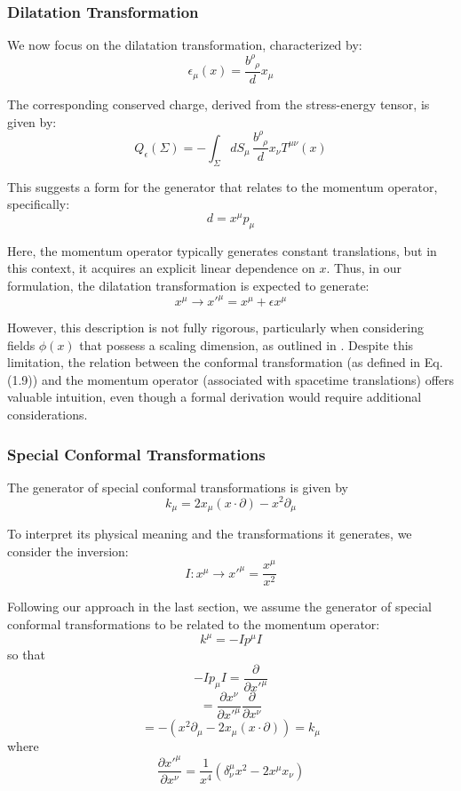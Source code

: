 \documentclass[12pt]{article}
\numberwithin{equation}{section}
\newcommand\<\langle
\renewcommand\>\rangle
\renewcommand\.{\cdot}
\begin{document}
\subsubsection*{Dilatation Transformation}
We now focus on the dilatation transformation, characterized by:
\[
    \epsilon_{\mu}(x) = \frac{b^{\rho}_{\,\,\,\rho}}{d}x_{\mu}
\]

The corresponding conserved charge, derived from the stress-energy tensor, is given by:
\[
    Q_{\epsilon}(\Sigma) = -\int_{\Sigma} dS_{\mu}\, \frac{b^{\rho}_{\,\,\,\rho}}{d}x_{\nu}T^{\mu\nu}(x)
\]

This suggests a form for the generator that relates to the momentum operator, specifically:
\[
    d = x^{\mu}p_{\mu}
\]

Here, the momentum operator typically generates constant translations, but in this context, it acquires an explicit linear dependence on \( x \). Thus, in our formulation, the dilatation transformation is expected to generate:
\[
    x^{\mu} \rightarrow x'^{\mu} = x^{\mu} + \epsilon x^{\mu}
\]

However, this description is not fully rigorous, particularly when considering fields \( \phi(x) \) that possess a scaling dimension, as outlined in \cite{DiFrancesco:1997nk}. Despite this limitation, the relation between the conformal transformation (as defined in Eq. (1.9)) and the momentum operator (associated with spacetime translations) offers valuable intuition, even though a formal derivation would require additional considerations.

\subsubsection*{Special Conformal Transformations}

The generator of special conformal transformations is given by
\begin{equation*}
    k_{\mu} = 2x_{\mu}(x\cdot\partial) - x^2\partial_{\mu}
\end{equation*}

To interpret its physical meaning and the transformations it generates, we consider the inversion:
\begin{equation*}
    I: x^{\mu} \rightarrow x'^{\mu} = \frac{x^{\mu}}{x^2}
\end{equation*}

Following our approach in the last section, we assume the generator of special conformal transformations to be related to the momentum operator:
\[
    k^{\mu} = -I p^{\mu} I
\]
so that
\[
    -I p_{\mu} I = \frac{\partial}{\partial x'^{\mu}}
\]
\[
    = \frac{\partial x^{\nu}}{\partial x'^{\mu}} \frac{\partial}{\partial x^{\nu}}
\]
\[
    = -\left(x^2 \partial_{\mu} - 2x_{\mu}(x \cdot \partial)\right) = k_{\mu}
\]
where
\[
    \frac{\partial x'^{\mu}}{\partial x^{\nu}} = \frac{1}{x^4} \left(\delta^{\mu}_{\nu} x^2 - 2x^{\mu} x_{\nu}\right)
\]
\end{document}
